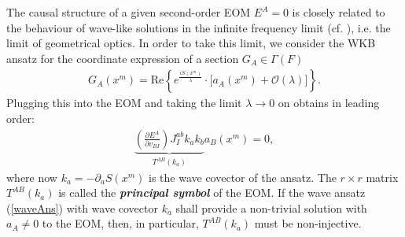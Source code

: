 \documentclass[%
 reprint,
nofootinbib,
 amsmath,amssymb,
 aps,
 prd,
floatfix,
]{revtex4-2}
\begin{document}
The causal structure of a given second-order EOM $E^A=0$ is closely related to the behaviour of wave-like solutions in the infinite frequency limit (cf. \cite{2018PhRvD..97h4036D}), i.e. the limit of geometrical optics. In order to take this limit, we consider the WKB ansatz for the coordinate expression of a section $G_A \in \Gamma(F)$
\begin{align}\label{waveAns}
    G_A(x^m) = \mathrm{Re}\left \{ e^{\frac{iS(x^m)}{\lambda}} \cdot   \bigl [ a_A(x^m) + \mathcal{O}(\lambda) \bigr ]\right \}.
\end{align}
Plugging this into the EOM and taking the limit $\lambda \rightarrow 0$ on obtains in leading order:
\begin{align}
    \underbrace{\left ( \frac{\partial E^A }{\partial v_{BI}} \right ) J_{I}^{ab} k_a k_b}_{T^{AB}(k_a)} a_B(x^m) = 0,
\end{align}
where now $k_a = - \partial_aS(x^m)$ is the wave covector of the ansatz. The $r\times r$ matrix $T^{AB}(k_a)$ is called the \textit{\textbf{principal symbol}} of the EOM. If the wave ansatz (\ref{waveAns}) with wave covector $k_a$ shall provide a non-trivial solution with $a_A \neq 0$ to the EOM, then, in particular,  $T^{AB}(k_a)$ must be non-injective. 
\end{document}
